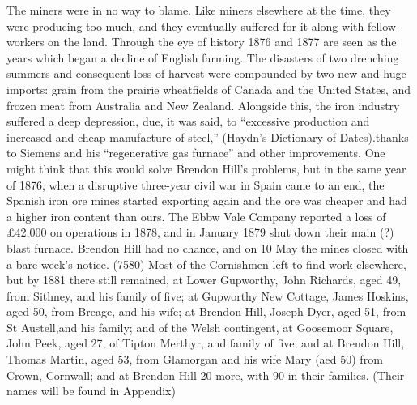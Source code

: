 \documentclass[10pt,a4paper]{article}
\begin{document}
The miners were in no way to blame. Like miners elsewhere at the time, they were producing too much, and they eventually suffered for it along with fellow-workers on the land.  Through the eye of history 1876 and 1877 are seen as the years which began a decline of English farming. The disasters of two drenching summers and consequent loss of harvest were compounded by two new and huge imports: grain from the prairie wheatfields of Canada and the United States, and frozen meat from Australia and New Zealand. Alongside this, the iron industry suffered a deep depression, due, it was said, to “excessive production and increased and cheap manufacture of steel,” (Haydn’s Dictionary of Dates).thanks to Siemens and his “regenerative gas furnace” and other improvements. One might think that this would solve Brendon Hill’s problems, but in the same year of 1876, when  a disruptive three-year civil war in Spain came to an end, the Spanish iron ore mines started exporting again and the ore was cheaper and had a higher iron content  than ours. The Ebbw Vale Company reported a loss of £42,000 on operations in 1878, and in January 1879 shut down their main (?) blast furnace. Brendon Hill had no chance, and on 10 May the mines closed with a bare week’s notice. (7580) Most of the Cornishmen left to find work elsewhere, but by 1881 there still remained, at Lower Gupworthy, John Richards, aged 49, from Sithney, and his family of five; at Gupworthy New Cottage, James Hoskins, aged 50, from Breage, and his wife; at Brendon Hill, Joseph Dyer, aged 51, from St Austell,and his family; and of the Welsh contingent, at Goosemoor Square, John Peek, aged 27, of Tipton Merthyr, and family of five; and at Brendon Hill, Thomas Martin, aged 53, from Glamorgan and his wife Mary (aed 50) from Crown, Cornwall; and at Brendon Hill 20 more, with 90 in their families. (Their names will be found in Appendix) 
\end{document}
